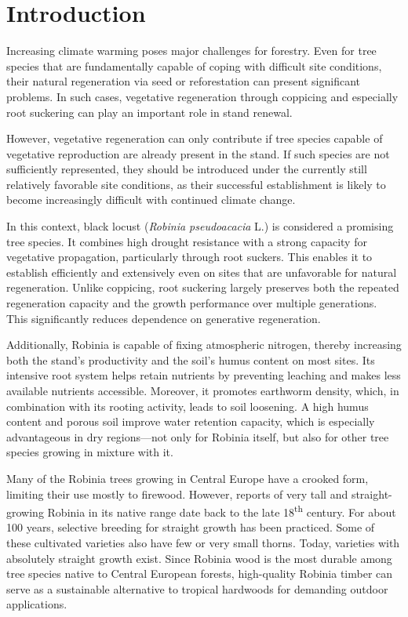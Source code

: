 \section{Introduction}

Increasing climate warming poses major challenges for forestry. Even for tree species that are fundamentally capable of coping with difficult site conditions, their natural regeneration via seed or reforestation can present significant problems. In such cases, vegetative regeneration through coppicing and especially root suckering can play an important role in stand renewal.

However, vegetative regeneration can only contribute if tree species capable of vegetative reproduction are already present in the stand. If such species are not sufficiently represented, they should be introduced under the currently still relatively favorable site conditions, as their successful establishment is likely to become increasingly difficult with continued climate change.

In this context, black locust (\emph{Robinia pseudoacacia} L.) is considered a promising tree species. It combines high drought resistance with a strong capacity for vegetative propagation, particularly through root suckers. This enables it to establish efficiently and extensively even on sites that are unfavorable for natural regeneration. Unlike coppicing, root suckering largely preserves both the repeated regeneration capacity and the growth performance over multiple generations. This significantly reduces dependence on generative regeneration.

Additionally, Robinia is capable of fixing atmospheric nitrogen, thereby increasing both the stand’s productivity and the soil’s humus content on most sites. Its intensive root system helps retain nutrients by preventing leaching and makes less available nutrients accessible. Moreover, it promotes earthworm density, which, in combination with its rooting activity, leads to soil loosening. A high humus content and porous soil improve water retention capacity, which is especially advantageous in dry regions—not only for Robinia itself, but also for other tree species growing in mixture with it.

Many of the Robinia trees growing in Central Europe have a crooked form, limiting their use mostly to firewood. However, reports of very tall and straight-growing Robinia in its native range date back to the late 18\textsuperscript{th} century. For about 100 years, selective breeding for straight growth has been practiced. Some of these cultivated varieties also have few or very small thorns. Today, varieties with absolutely straight growth exist. Since Robinia wood is the most durable among tree species native to Central European forests, high-quality Robinia timber can serve as a sustainable alternative to tropical hardwoods for demanding outdoor applications.


